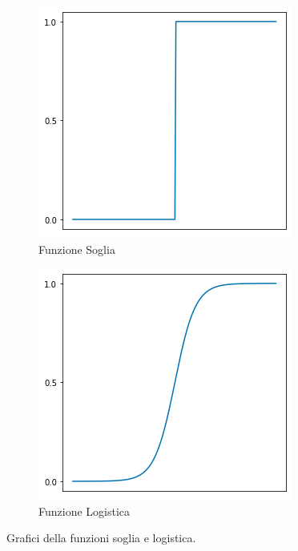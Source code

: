 \documentclass[../../main.tex]{subfiles}
\begin{document}
    \begin{figure}[H]
        \begin{subfigure}{0.5\textwidth}
            \centering
            \includegraphics[width=\textwidth]{immagini/4_1/threshold.png} 
            \caption{Funzione Soglia}
            \label{fig:threshold}
        \end{subfigure}
        \begin{subfigure}{0.5\textwidth}
            \centering
            \includegraphics[width=\textwidth]{immagini/4_1/logistic.png}
            \caption{Funzione Logistica}
            \label{fig:logistic}
        \end{subfigure}
        \caption{Grafici della funzioni soglia e logistica.}
    \end{figure}
\end{document}
